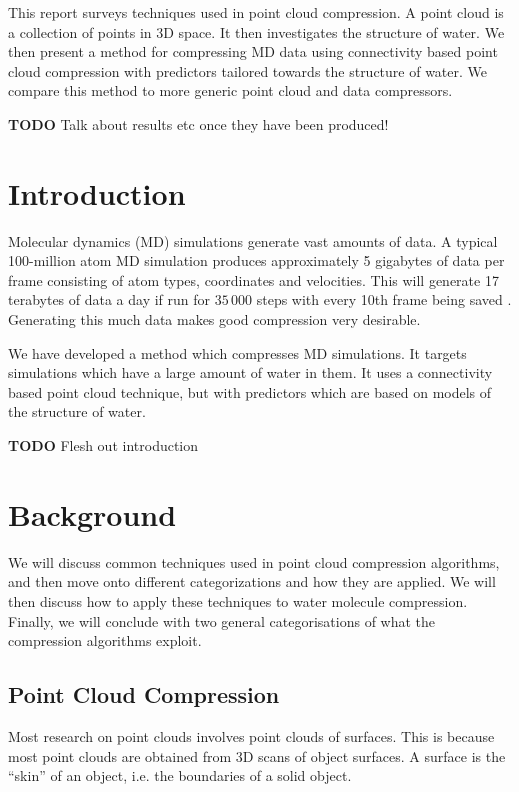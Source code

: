\documentclass{report}
\begin{document}
This report surveys techniques used in point cloud compression. A point cloud
is a collection of points in 3D space. It then investigates the structure of
water. We then present a method for compressing MD data using connectivity
based point cloud compression with predictors tailored towards the structure
of water. We compare this method to more generic point cloud and data
compressors.

\textbf{TODO} Talk about results etc once they have been produced!

\tableofcontents

\chapter{Introduction}

Molecular dynamics (MD) simulations generate vast amounts of data. A typical
100-million atom MD simulation produces approximately 5 gigabytes of data per
frame consisting of atom types, coordinates and velocities. This will generate
17 terabytes of data a day if run for $35\,000$ steps with every 10th frame
being saved \citep{omeltchenko2000sls}. Generating this much data makes good
compression very desirable.

We have developed a method which compresses MD simulations. It targets
simulations which have a large amount of water in them. It uses a connectivity
based point cloud technique, but with predictors which are based on models of
the structure of water.

\textbf{TODO} Flesh out introduction

\chapter{Background}

We will discuss common techniques used in point cloud compression algorithms,
and then move onto different categorizations and how they are applied. We will
then discuss how to apply these techniques to water molecule
compression. Finally, we will conclude with two general categorisations of
what the compression algorithms exploit.

\section{Point Cloud Compression}

Most research on point clouds involves point clouds of surfaces. This is
because most point clouds are obtained from 3D scans of object surfaces. A
surface is the ``skin'' of an object, i.e. the boundaries of a solid object.
\end{document}

